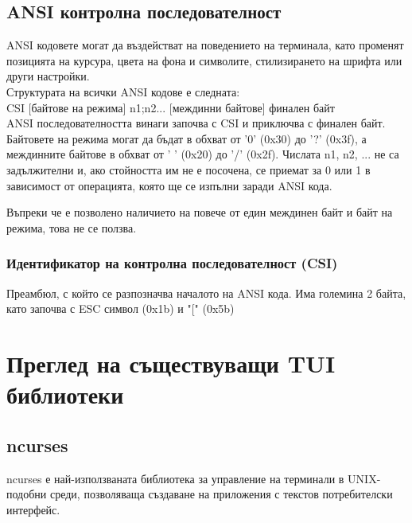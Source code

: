         \subsection{ANSI контролна последователност}
                ANSI кодовете могат да въздействат на поведението на терминала,
                като променят позицията на курсура, цвета на фона и символите, 
                стилизирането на шрифта или други настройки. \\

                Структурата на всички ANSI кодове е следната: \\
                CSI [байтове на режима] n1;n2... [междинни байтове] финален
                байт \\ 

                ANSI последователността винаги започва с CSI и приключва с
                финален байт. Байтовете на режима могат да бъдат в обхват от
                '0' (0x30) до '?' (0x3f), а междинните байтове в обхват от ' '
                (0x20) до '/' (0x2f). Числата n1, n2, ... не са задължителни и,
                ако стойността им не е посочена, се приемат за 0 или 1 в 
                зависимост от операцията, която ще се изпълни заради ANSI кода. 

                Въпреки че е позволено наличието на повече от един междинен 
                байт и байт на режима, това не се ползва.


                \subsubsection{Идентификатор на контролна последователност 
                (CSI)}
                        Преамбюл, с който се разпозначва началото на ANSI кода.
                        Има големина 2 байта, като започва с ESC символ (0x1b) 
                        и "[" (0x5b) \\

\section{Преглед на съществуващи TUI библиотеки}
        \vspace{10mm}
        \subsection{ncurses}
                ncurses е най-използваната библиотека за управление на 
                терминали в UNIX-подобни среди, позволяваща създаване на 
                приложения с текстов потребителски интерфейс. \\

